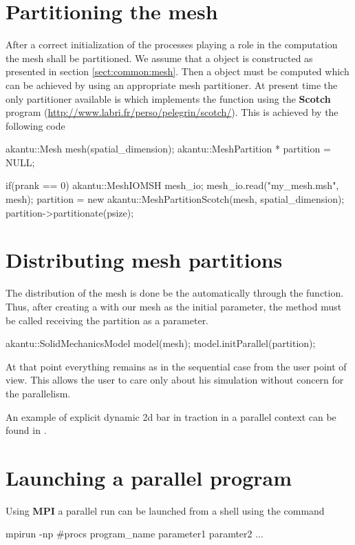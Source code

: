 \section{Partitioning the mesh}

After a correct initialization of the processes playing a role in the 
computation the mesh shall be partitioned. We assume that a  object 
is constructed as presented in section \ref{sect:common:mesh}.
Then a  object must be computed which can be achieved 
by using an appropriate mesh partitioner. At present time the only partitioner 
available is  which implements the function
 using the \textbf{Scotch} program 
(\url{http://www.labri.fr/perso/pelegrin/scotch/}). 
This is achieved by the following code

\begin{cpp}
  akantu::Mesh mesh(spatial_dimension);
  akantu::MeshPartition * partition = NULL;
  
  if(prank == 0) {
    akantu::MeshIOMSH mesh_io;
    mesh_io.read("my_mesh.msh", mesh);
    partition = new akantu::MeshPartitionScotch(mesh, spatial_dimension);
    partition->partitionate(psize);
  }
\end{cpp} 


\section{Distributing mesh partitions}

The distribution of the mesh is done be the 
automatically through the  function. 
Thus, after creating a  with our mesh 
as the initial parameter, the  method must be called 
receiving the partition as a parameter.

\begin{cpp}
  akantu::SolidMechanicsModel model(mesh);
  model.initParallel(partition);
\end{cpp} 

At that point everything remains as in the sequential case from 
the user point of view. This allows the user to care only 
about his simulation without concern for the parallelism.

An example of explicit dynamic 2d bar in traction in a parallel
context can be found in .

\section{Launching a parallel program}

Using \textbf{MPI} a parallel run can be launched from a shell 
using the command 

\begin{cpp}
  mpirun -np #procs program_name parameter1 paramter2 ...
\end{cpp} 
